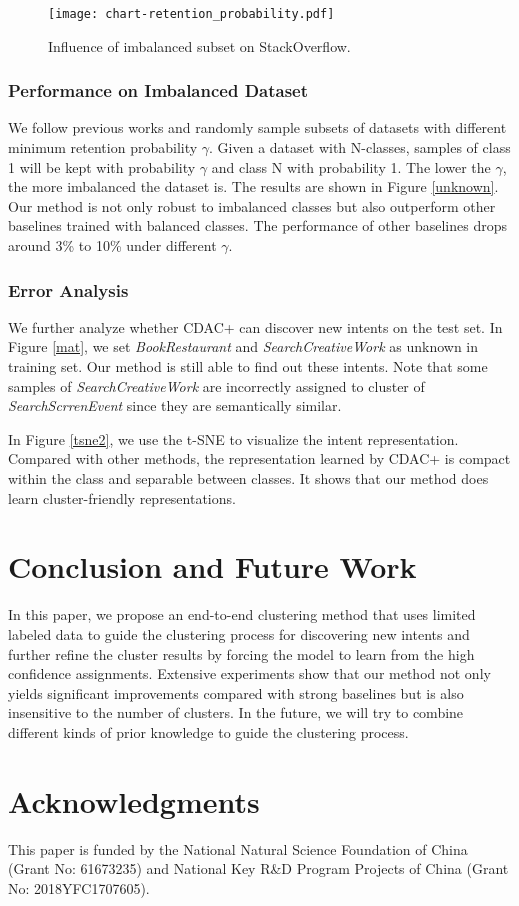 \documentclass[letterpaper]{article} \usepackage{aaai20}  \usepackage{times}  \usepackage{helvet} \usepackage{courier}  \usepackage[hyphens]{url}  \usepackage{graphicx} \urlstyle{rm} \def\UrlFont{\rm}  \usepackage{graphicx}  \frenchspacing  \setlength{\pdfpagewidth}{8.5in}  \setlength{\pdfpageheight}{11in}
\begin{document}
\begin{figure}[t!]
  \centering  
  \texttt{[image: chart-retention\_probability.pdf]}
  \caption{\label{retention_probability} Influence of imbalanced subset on StackOverflow.}
\end{figure}


\subsubsection{Performance on Imbalanced Dataset}
We follow previous works \cite{chang2017deep} and randomly sample subsets of datasets with different minimum retention probability $\gamma$. Given a dataset with N-classes, samples of class 1 will be kept with probability $\gamma$ and class N with probability 1. The lower the $\gamma$, the more imbalanced the dataset is. The results are shown in Figure \ref{unknown}. Our method is not only robust to imbalanced classes but also outperform other baselines trained with balanced classes. The performance of other baselines drops around 3\% to 10\% under different $\gamma$.

\subsubsection{Error Analysis}
We further analyze whether CDAC+ can discover new intents on the test set. In Figure \ref{mat}, we set \textit{BookRestaurant} and \textit{SearchCreativeWork} as unknown in training set. Our method is  still able to find out these intents. Note that some samples of \textit{SearchCreativeWork} are incorrectly assigned to cluster of \textit{SearchScrrenEvent} since they are semantically similar. 

In Figure \ref{tsne2}, we use the t-SNE \cite{maaten2008visualizing} to visualize the intent representation. Compared with other methods, the representation learned by CDAC+ is compact within the class and separable between classes. It shows that our method does learn cluster-friendly representations.

\section{Conclusion and Future Work}
In this paper, we propose an end-to-end clustering method that uses limited labeled data to guide the clustering process for discovering new intents and further refine the cluster results by forcing the model to learn from the high confidence assignments. Extensive experiments show that our method not only yields significant improvements compared with strong baselines but is also insensitive to the number of clusters. In the future, we will try to combine different kinds of prior knowledge to guide the clustering process.

\section{Acknowledgments}
This paper is funded by the National Natural Science Foundation of China (Grant No: 61673235) and National Key R\&D Program Projects of China (Grant No: 2018YFC1707605).

\small 

\end{document}
